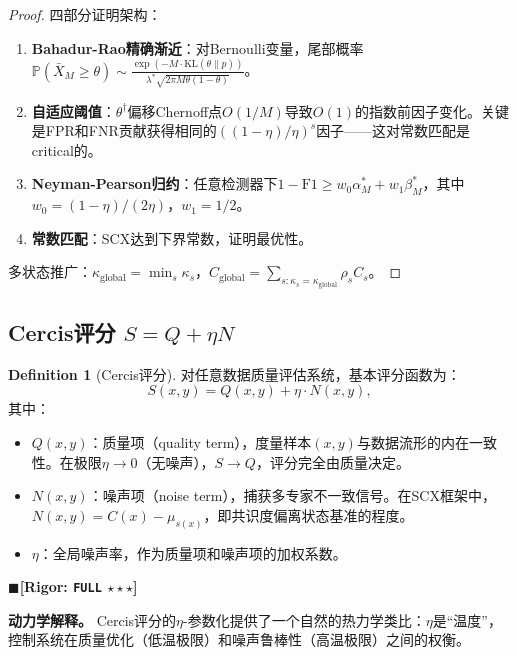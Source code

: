 \documentclass[12pt,a4paper]{ctexart}
\theoremstyle{definition}
\newtheorem{definition}{Definition}[section]
\theoremstyle{remark}
\newcommand{\rigorFull}{$\blacksquare$\;\textbf{[Rigor: \texttt{FULL} $\star\star\star$]}}
\begin{document}
\begin{proof}
四部分证明架构：
\begin{enumerate}[label=\arabic*.]
\item \textbf{Bahadur-Rao精确渐近}：对Bernoulli变量，尾部概率$\mathbb{P}(\bar{X}_M \geq \theta) \sim \frac{\exp(-M\cdot\mathrm{KL}(\theta\|p))}{\lambda^*\sqrt{2\pi M\theta(1-\theta)}}$。
\item \textbf{自适应阈值}：$\theta^\dagger$偏移Chernoff点$O(1/M)$导致$O(1)$的指数前因子变化。关键是FPR和FNR贡献获得相同的$((1-\eta)/\eta)^s$因子——这对常数匹配是critical的。
\item \textbf{Neyman-Pearson归约}：任意检测器下$1-\mathrm{F1} \geq w_0\alpha_M^* + w_1\beta_M^*$，其中$w_0=(1-\eta)/(2\eta)$，$w_1=1/2$。
\item \textbf{常数匹配}：SCX达到下界常数，证明最优性。
\end{enumerate}
多状态推广：$\kappa_{\text{global}} = \min_s \kappa_s$，$C_{\text{global}} = \sum_{s: \kappa_s = \kappa_{\text{global}}} \rho_s C_s$。
\end{proof}

\subsection{Cercis评分 $S = Q + \eta N$}

\begin{definition}[Cercis评分]
对任意数据质量评估系统，基本评分函数为：
\begin{equation}
S(x, y) = Q(x, y) + \eta \cdot N(x, y),
\end{equation}
其中：
\begin{itemize}
\item $Q(x, y)$：质量项（quality term），度量样本$(x, y)$与数据流形的内在一致性。在极限$\eta \to 0$（无噪声），$S \to Q$，评分完全由质量决定。
\item $N(x, y)$：噪声项（noise term），捕获多专家不一致信号。在SCX框架中，$N(x, y) = C(x) - \mu_{s(x)}$，即共识度偏离状态基准的程度。
\item $\eta$：全局噪声率，作为质量项和噪声项的加权系数。
\end{itemize}
\end{definition}
\rigorFull

\textbf{动力学解释。} Cercis评分的$\eta$-参数化提供了一个自然的热力学类比：$\eta$是``温度''，控制系统在质量优化（低温极限）和噪声鲁棒性（高温极限）之间的权衡。
\end{document}
